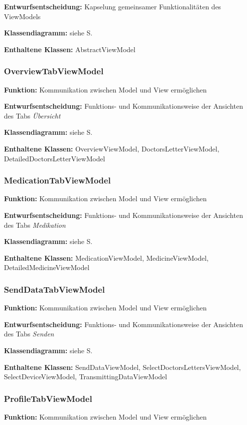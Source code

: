 \documentclass[a4paper]{scrreprt}
\begin{document}
\textbf{Entwurfsentscheidung:} Kapselung gemeinsamer Funktionalitäten des ViewModels

\textbf{Klassendiagramm:} siehe S.

\textbf{Enthaltene Klassen:} AbstractViewModel

\subsubsection{OverviewTabViewModel}
\textbf{Funktion:} Kommunikation zwischen Model und View ermöglichen

\textbf{Entwurfsentscheidung:} Funktions- und Kommunikationsweise der Ansichten des Tabs \textit{Übersicht}

\textbf{Klassendiagramm:} siehe S.

\textbf{Enthaltene Klassen:} OverviewViewModel, DoctorsLetterViewModel, DetailedDoctorsLetterViewModel

\subsubsection{MedicationTabViewModel}
\textbf{Funktion:} Kommunikation zwischen Model und View ermöglichen

\textbf{Entwurfsentscheidung:} Funktions- und Kommunikationsweise der Ansichten des Tabs \textit{Medikation}

\textbf{Klassendiagramm:} siehe S.

\textbf{Enthaltene Klassen:} MedicationViewModel, MedicineViewModel, DetailedMedicineViewModel

\subsubsection{SendDataTabViewModel}
\textbf{Funktion:} Kommunikation zwischen Model und View ermöglichen

\textbf{Entwurfsentscheidung:} Funktions- und Kommunikationsweise der Ansichten des Tabs \textit{Senden}

\textbf{Klassendiagramm:} siehe S.

\textbf{Enthaltene Klassen:} SendDataViewModel, SelectDoctorsLettersViewModel, SelectDeviceViewModel, TransmittingDataViewModel

\subsubsection{ProfileTabViewModel}
\textbf{Funktion:} Kommunikation zwischen Model und View ermöglichen
\end{document}
